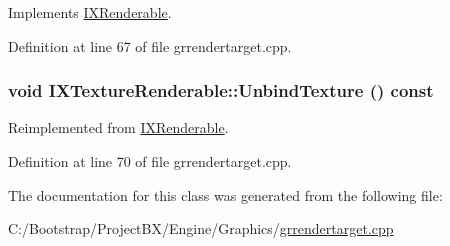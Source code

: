 Implements \hyperlink{class_i_x_renderable_aa7a8918c305cc562df3f3f44cd761d7}{IXRenderable}.

Definition at line 67 of file grrendertarget.cpp.\hypertarget{class_i_x_texture_renderable_6cf2f52580c043bdf381d1a6e13c09e9}{
\subsubsection[{UnbindTexture}]{\setlength{\rightskip}{0pt plus 5cm}void IXTextureRenderable::UnbindTexture () const}}
\label{class_i_x_texture_renderable_6cf2f52580c043bdf381d1a6e13c09e9}




Reimplemented from \hyperlink{class_i_x_renderable_a6c88c0ccc0cc869114309de6843f5ac}{IXRenderable}.

Definition at line 70 of file grrendertarget.cpp.

The documentation for this class was generated from the following file:\begin{CompactItemize}
\item 
C:/Bootstrap/ProjectBX/Engine/Graphics/\hyperlink{grrendertarget_8cpp}{grrendertarget.cpp}\end{CompactItemize}

